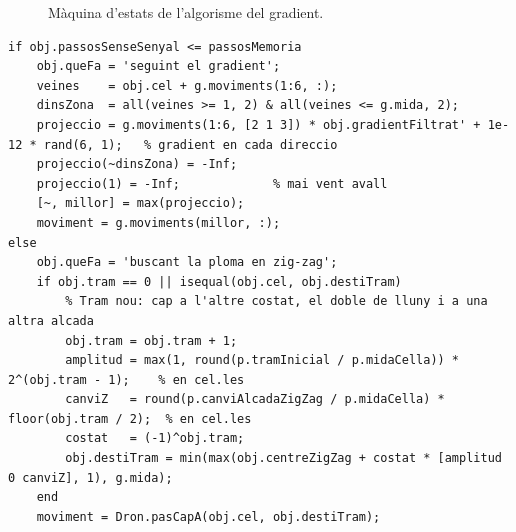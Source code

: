 \documentclass[11pt,a4paper]{article}
\begin{document}
\begin{figure}[htbp]
\centering
{}
\caption{Màquina d'estats de l'algorisme del gradient.}
\label{fig:estats}
\end{figure}

\begin{lstlisting}[caption={Decisió del gradient en cada estat (part de \texttt{Dron.gradientDecidir}).}, label=lst:gradient]
if obj.passosSenseSenyal <= passosMemoria
    obj.queFa = 'seguint el gradient';
    veines    = obj.cel + g.moviments(1:6, :);
    dinsZona  = all(veines >= 1, 2) & all(veines <= g.mida, 2);
    projeccio = g.moviments(1:6, [2 1 3]) * obj.gradientFiltrat' + 1e-12 * rand(6, 1);   % gradient en cada direccio
    projeccio(~dinsZona) = -Inf;
    projeccio(1) = -Inf;             % mai vent avall
    [~, millor] = max(projeccio);
    moviment = g.moviments(millor, :);
else
    obj.queFa = 'buscant la ploma en zig-zag';
    if obj.tram == 0 || isequal(obj.cel, obj.destiTram)
        % Tram nou: cap a l'altre costat, el doble de lluny i a una altra alcada
        obj.tram = obj.tram + 1;
        amplitud = max(1, round(p.tramInicial / p.midaCella)) * 2^(obj.tram - 1);    % en cel.les
        canviZ   = round(p.canviAlcadaZigZag / p.midaCella) * floor(obj.tram / 2);  % en cel.les
        costat   = (-1)^obj.tram;
        obj.destiTram = min(max(obj.centreZigZag + costat * [amplitud 0 canviZ], 1), g.mida);
    end
    moviment = Dron.pasCapA(obj.cel, obj.destiTram);
\end{lstlisting}
\end{document}
